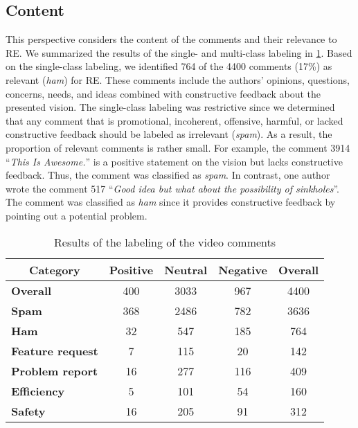 \documentclass[conference]{IEEEtran}
\begin{document}
{\subsection{Content}
\label{sec:content}
This perspective considers the content of the comments and their relevance to RE. We summarized the results of the single- and multi-class labeling in \tablename{ \ref{tbl:labeling}}. Based on the single-class labeling, we identified 764 of the 4400 comments (17\%) as relevant (\textit{ham}) for RE. These comments include the authors' opinions, questions, concerns, needs, and ideas combined with constructive feedback about the presented vision. The single-class labeling was restrictive since we determined that any comment that is promotional, incoherent, offensive, harmful, or lacked constructive feedback should be labeled as irrelevant (\textit{spam}). As a result, the proportion of relevant comments is rather small. For example, the comment 3914 \enquote{\textit{This Is Awesome.}} is a positive statement on the vision but lacks constructive feedback. Thus, the comment was classified as \textit{spam}. In contrast, one author wrote the comment 517 \enquote{\textit{Good idea but what about the possibility of sinkholes}}. The comment was classified as \textit{ham} since it provides constructive feedback by pointing out a potential problem.

\newcommand*{\MyIndent}{\hspace*{0.25cm}}%
\begin{table}[htbp]
	\renewcommand{\arraystretch}{1.3}
	\captionsetup{justification=justified}
	\centering
	\caption{Results of the labeling of the video comments}
	\label{tbl:labeling}
	\begin{tabular}{|l|c|c|c|c|}
		\hline
		\multicolumn{1}{|c|}{\textbf{Category}} & \textbf{Positive} & \textbf{Neutral} & \textbf{Negative} & \textbf{Overall} \\ \hline \hline
		\textbf{Overall} & 400 & 3033 & 967 & 4400 \\ \hline
		\textbf{Spam} & 368 & 2486 & 782 & 3636 \\ \hline
		\textbf{Ham} & 32 & 547 & 185 & 764 \\ \cline{2-5}
		\MyIndent \textbf{Feature request} & 7 & 115 & 20 & 142 \\ \cline{2-5}
		\MyIndent \textbf{Problem report} & 16 & 277 & 116 & 409 \\ \cline{2-5}
		\MyIndent \textbf{Efficiency} & 5 & 101 & 54 & 160 \\ \cline{2-5}
		\MyIndent \textbf{Safety} & 16 & 205 & 91 & 312 \\ \hline
	\end{tabular}
\end{table}

}
\end{document}

